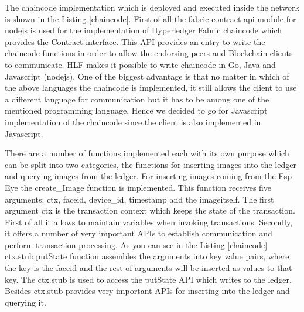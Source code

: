 The chaincode implementation which is deployed and executed inside the network is shown in the Listing \ref{chaincode}. First of all the {\selectfont fabric-contract-api} module for nodejs is used for the implementation of Hyperledger Fabric chaincode which provides the {\selectfont Contract} interface. This API provides an entry to write the chaincode functions in order to allow the endorsing peers and Blockchain clients to communicate. HLF makes it possible to write chaincode in Go, Java and Javascript (nodejs). One of the biggest advantage is that no matter in which of the above languages the chaincode is implemented, it still allows the client to use a different language for communication but it has to be among one of the mentioned programming language. Hence we decided to go for Javascript implementation of the chaincode since the client is also implemented in Javascript. 

There are a number of functions implemented each with its own purpose which can be split into two categories, the functions for inserting images into the ledger and querying images from the ledger.  For inserting images coming from the Esp Eye the {\selectfont create\_Image} function is implemented. This function receives five arguments: {\selectfont ctx}, {\selectfont faceid}, {\selectfont device\_id}, {\selectfont timestamp} and the {\selectfont imageitself}.
The first argument {\selectfont ctx} is the transaction context which keeps the state of the transaction. First of all it allows to maintain variables when invoking transactions. Secondly, it offers a number of very important APIs to establish communication and perform transaction processing. As you can see in the Listing \ref{chaincode} {\selectfont ctx.stub.putState} function assembles the arguments into key value pairs, where the key is the {\selectfont faceid} and the rest of arguments will be inserted as values to that key. The {\selectfont ctx.stub} is used to access the 
{\selectfont putState} API which writes to the ledger. Besides {\selectfont ctx.stub} provides very important APIs for inserting into the ledger and querying it.  










